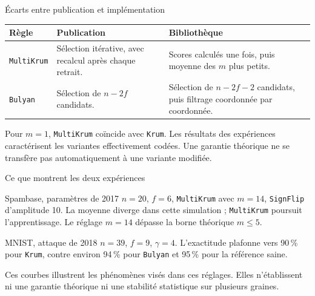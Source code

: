 \begin{frame}{Écarts entre publication et implémentation}
    \small
    \begin{tabular}{@{}p{}p{}p{}@{}}
        \textbf{Règle} & \textbf{Publication} & \textbf{Bibliothèque} \\
        \hline
        \texttt{MultiKrum} &
        Sélection itérative, avec recalcul après chaque retrait. &
        Scores calculés une fois, puis moyenne des $m$ plus petits. \\
        \texttt{Bulyan} &
        Sélection de $n-2f$ candidats. &
        Sélection de $n-2f-2$ candidats, puis filtrage coordonnée par coordonnée.
    \end{tabular}

    \medskip
    Pour $m=1$, \texttt{MultiKrum} coïncide avec \texttt{Krum}.
    Les résultats des expériences caractérisent les variantes effectivement
    codées. Une garantie théorique ne se transfère pas automatiquement à une
    variante modifiée.
\end{frame}

\begin{frame}{Ce que montrent les deux expériences}
    \small
    \begin{block}{Spambase, paramètres de 2017}
        $n=20$, $f=6$, \texttt{MultiKrum} avec $m=14$, \texttt{SignFlip}
        d'amplitude 10. La moyenne diverge dans cette simulation ;
        \texttt{MultiKrum} poursuit l'apprentissage.
        Le réglage $m=14$ dépasse la borne théorique $m\leq5$.
    \end{block}
    \begin{block}{MNIST, attaque de 2018}
        $n=39$, $f=9$, $\gamma=4$. L'exactitude plafonne vers 90\,\% pour
        \texttt{Krum}, contre environ 94\,\% pour \texttt{Bulyan} et 95\,\%
        pour la référence saine.
    \end{block}
    Ces courbes illustrent les phénomènes visés dans ces réglages. Elles
    n'établissent ni une garantie théorique ni une stabilité statistique
    sur plusieurs graines.
\end{frame}

